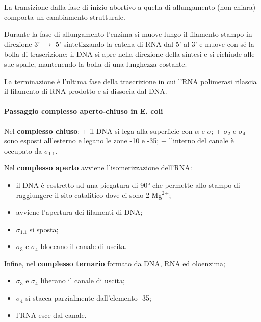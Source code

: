 \documentclass[]{article}
\begin{document}
La transizione dalla fase di inizio abortivo a quella di allungamento
(non chiara) comporta un cambiamento strutturale.

Durante la fase di allungamento l'enzima si muove lungo il filamento
stampo in direzione 3' \(\rightarrow\) 5' sintetizzando la catena di RNA
dal 5' al 3' e muove con sé la bolla di trascrizione; il DNA si apre
nella direzione della sintesi e si richiude alle sue spalle, mantenendo
la bolla di una lunghezza costante.

La terminazione è l'ultima fase della trascrizione in cui l'RNA
polimerasi rilascia il filamento di RNA prodotto e si dissocia dal DNA.

\paragraph{Passaggio complesso aperto-chiuso in E.
coli}\label{passaggio-complesso-aperto-chiuso-in-e.-coli}

Nel \textbf{complesso chiuso}: + il DNA si lega alla superficie con
\(\alpha\) e \(\sigma\); + \(\sigma\)\(_2\) e \(\sigma\)\(_4\) sono
esposti all'esterno e legano le zone -10 e -35; + l'interno del canale è
occupato da \(\sigma\)\(_1.1\).

Nel \textbf{complesso aperto} avviene l'isomerizzazione dell'RNA:

\begin{itemize}
\itemsep1pt\parskip0pt
\item
  il DNA è costretto ad una piegatura di 90° che permette allo stampo di
  raggiungere il sito catalitico dove ci sono 2 Mg\(^2\)\(^+\);
\item
  avviene l'apertura dei filamenti di DNA;
\item
  \(\sigma\)\(_1.1\) si sposta;
\item
  \(\sigma\)\(_3\) e \(\sigma\)\(_4\) bloccano il canale di uscita.
\end{itemize}

Infine, nel \textbf{complesso ternario} formato da DNA, RNA ed
oloenzima;

\begin{itemize}
\itemsep1pt\parskip0pt
\item
  \(\sigma\)\(_3\) e \(\sigma\)\(_4\) liberano il canale di uscita;
\item
  \(\sigma\)\(_4\) si stacca parzialmente dall'elemento -35;
\item
  l'RNA esce dal canale.
\end{itemize}
\end{document}
